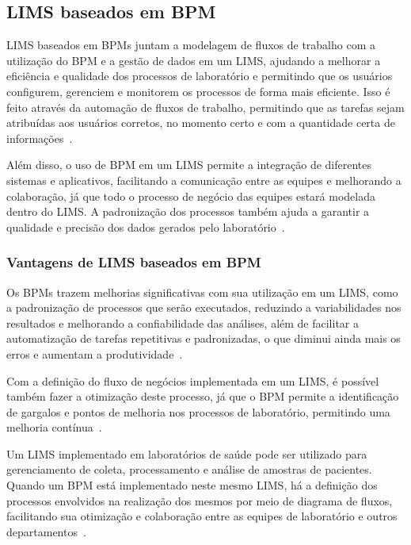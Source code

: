 \subsection{LIMS baseados em BPM}


LIMS baseados em BPMs juntam a modelagem de fluxos de trabalho com a utilização do BPM e a gestão de dados em um LIMS, ajudando a melhorar a eficiência e qualidade dos processos de laboratório e permitindo que os usuários configurem, gerenciem e monitorem os processos de forma mais eficiente. Isso é feito através da automação de fluxos de trabalho, permitindo que as tarefas sejam atribuídas aos usuários corretos, no momento certo e com a quantidade certa de informações~\cite{LIMS-BPMSLaboratory, LIMS-BPMSLaboratoryb}.

Além disso, o uso de BPM em um LIMS permite a integração de diferentes sistemas e aplicativos, facilitando a comunicação entre as equipes e melhorando a colaboração, já que todo o processo de negócio das equipes estará modelada dentro do LIMS. A padronização dos processos também ajuda a garantir a qualidade e precisão dos dados gerados pelo laboratório~\cite{LIMS-BPMSLaboratory, LIMS-BPMSLaboratoryb}.


\subsubsection{Vantagens de LIMS baseados em BPM}

Os BPMs trazem melhorias significativas com sua utilização em um LIMS, como a padronização de processos que serão executados, reduzindo a variabilidades nos resultados e melhorando a confiabilidade das análises, além de facilitar a automatização de tarefas repetitivas e padronizadas, o que diminui ainda mais os erros e aumentam a produtividade~\cite{LIMS-BPMSLaboratory, LIMS-BPMSLaboratoryb}.

Com a definição do fluxo de negócios implementada em um LIMS, é possível também fazer a otimização deste processo, já que o BPM permite a identificação de gargalos e pontos de melhoria nos processos de laboratório, permitindo uma melhoria contínua~\cite{Ko2009BusinessSurvey}.

Um LIMS implementado em laboratórios de saúde pode ser utilizado para gerenciamento de coleta, processamento e análise de amostras de pacientes. Quando um BPM está implementado neste mesmo LIMS, há a definição dos processos envolvidos na realização dos mesmos por meio de diagrama de fluxos, facilitando sua otimização e colaboração entre as equipes de laboratório e outros departamentos~\cite{LIMS-BPMSLaboratory, LIMS-BPMSLaboratoryb}.

